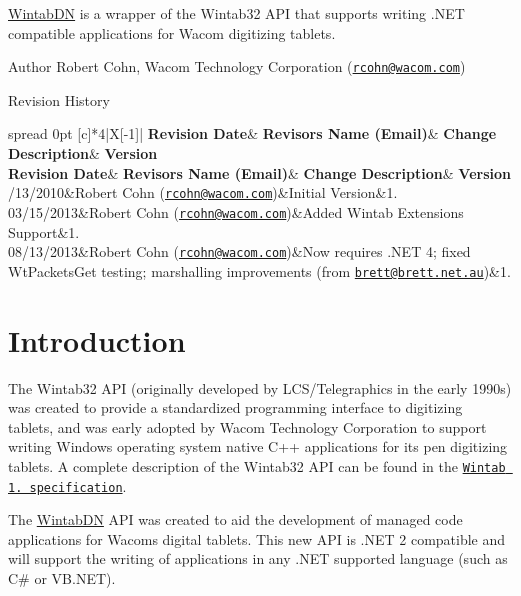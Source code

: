 \mbox{\hyperlink{namespace_wintab_d_n}{Wintab\+DN}} is a wrapper of the Wintab32 A\+PI that supports writing .N\+ET compatible applications for Wacom digitizing tablets. \begin{DoxyAuthor}{Author}
Robert Cohn, Wacom Technology Corporation (\href{mailto:rcohn@wacom.com}{\tt rcohn@wacom.\+com})
\end{DoxyAuthor}
\begin{DoxyParagraph}{Revision History}
\tabulinesep=1mm
\begin{longtabu} spread 0pt [c]{*{4}{|X[-1]}|}
\hline
\rowcolor{\tableheadbgcolor}\textbf{ Revision Date}&\textbf{ Revisor\textquotesingle{}s Name (Email)}&\textbf{ Change Description}&\textbf{ Version  }\\
\endfirsthead
\hline
\endfoot
\hline
\rowcolor{\tableheadbgcolor}\textbf{ Revision Date}&\textbf{ Revisor\textquotesingle{}s Name (Email)}&\textbf{ Change Description}&\textbf{ Version  }\\
/13/2010&Robert Cohn (\href{mailto:rcohn@wacom.com}{\tt rcohn@wacom.\+com})&Initial Version&1.  \\
03/15/2013&Robert Cohn (\href{mailto:rcohn@wacom.com}{\tt rcohn@wacom.\+com})&Added Wintab Extensions Support&1.  \\
08/13/2013&Robert Cohn (\href{mailto:rcohn@wacom.com}{\tt rcohn@wacom.\+com})&Now requires .N\+ET 4; fixed Wt\+Packets\+Get testing; marshalling improvements (from \href{mailto:brett@brett.net.au}{\tt brett@brett.\+net.\+au})&1.  \\
\end{longtabu}

\end{DoxyParagraph}
\hypertarget{index_intro_sec}{}\section{Introduction}\label{index_intro_sec}
The Wintab32 A\+PI (originally developed by L\+C\+S/\+Telegraphics in the early 1990s) was created to provide a standardized programming interface to digitizing tablets, and was early adopted by Wacom Technology Corporation to support writing Windows operating system native C++ applications for its pen digitizing tablets. A complete description of the Wintab32 A\+PI can be found in the \href{Wintab_v140.htm}{\tt Wintab 1. specification}.

The \mbox{\hyperlink{namespace_wintab_d_n}{Wintab\+DN}} A\+PI was created to aid the development of managed code applications for Wacom\textquotesingle{}s digital tablets. This new A\+PI is .N\+ET 2 compatible and will support the writing of applications in any .N\+ET supported language (such as C\# or V\+B.\+N\+ET).

